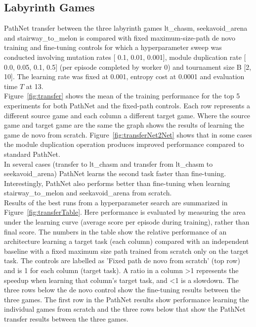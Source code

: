 \documentclass{sig-alternate-05-2015}
\begin{document}
\subsection{Labyrinth Games}

PathNet transfer between the three labyrinth games lt\_chasm, seekavoid\_arena and stairway\_to\_melon is compared with fixed maximum-size-path de novo training and fine-tuning controls for which a hyperparameter sweep was conducted involving mutation rates [ 0.1, 0.01, 0.001], module duplication rate [ 0.0, 0.05, 0.1, 0.5] (per episode completed by worker 0) and tournament size B [2, 10]. The learning rate was fixed at 0.001, entropy cost at 0.0001 and evaluation time \(T\) at 13.\\

Figure~\ref{fig:transfer} shows the mean of the training performance for the top 5 experiments for both PathNet and the fixed-path controls. Each row represents a different source game and each column a different target game. Where the source game and target game are the same the graph shows the results of learning the game de novo from scratch. Figure~\ref{fig:transferNet2Net} shows that in some cases the module duplication operation produces improved performance compared to standard PathNet. \\

In several cases (transfer to lt\_chasm and transfer from lt\_chasm to seekavoid\_arena) PathNet learns the second task faster than fine-tuning. Interestingly, PathNet also performs better than fine-tuning when learning stairway\_to\_melon and seekavoid\_arena from scratch.\\

Results of the best runs from a hyperparameter search are summarized in Figure~\ref{fig:transferTable}. Here performance is evaluated by measuring the area under the learning curve (average score per episode during training), rather than final score. The numbers in the table show the relative performance of an architecture learning a target task (each column) compared with an independent baseline with a fixed maximum size path trained from scratch only on the target task. The controls are labelled as 'Fixed path de novo from scratch' (top row) and is 1 for each column (target task). A ratio in a column >1 represents the speedup when learning that column's target task, and <1 is a slowdown. The three rows below the de novo control show the fine-tuning results between the three games. The first row in the PathNet results show performance learning the individual games from scratch and the three rows below that show the PathNet transfer results between the three games.\\
\end{document}
